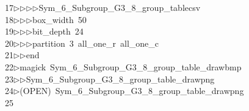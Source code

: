 \begin{tabbing}
17\>$\triangleright$\>$\triangleright$\>$\triangleright$\>$\triangleright$\>Sym\_6\_Subgroup\_G3\_8\_group\_tablecsv\ \\[0pt]
18\>$\triangleright$\>$\triangleright$\>$\triangleright$\>box\_width\ 50\ \\[0pt]
19\>$\triangleright$\>$\triangleright$\>$\triangleright$\>bit\_depth\ 24\ \\[0pt]
20\>$\triangleright$\>$\triangleright$\>$\triangleright$\>partition\ 3\ all\_one\_r\ all\_one\_c\ \\[0pt]
21\>$\triangleright$\>$\triangleright$\>end\\[0pt]
22\>$\triangleright$\>magick\ Sym\_6\_Subgroup\_G3\_8\_group\_table\_drawbmp\ \\[0pt]
23\>$\triangleright$\>$\triangleright$\>Sym\_6\_Subgroup\_G3\_8\_group\_table\_drawpng\\[0pt]
24\>$\triangleright$\>(OPEN)\ Sym\_6\_Subgroup\_G3\_8\_group\_table\_drawpng\\[0pt]
25\>\end{tabbing}
